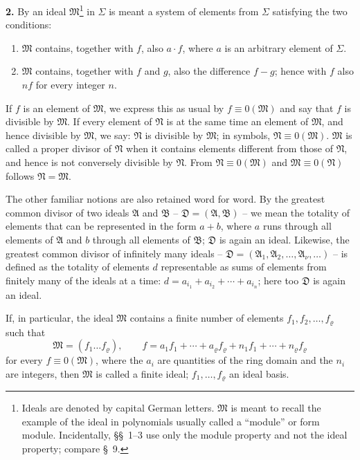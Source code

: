 \documentclass[11pt]{article}
\newcommand{\ideal}[1]{\mathfrak{#1}}
\begin{document}
\textbf{2.} By an ideal $\ideal M$\footnote{Ideals are denoted by capital German letters. $\ideal M$ is meant to recall the example of the ideal in polynomials usually called a ``module'' or form module. Incidentally, \S\S~1--3 use only the module property and not the ideal property; compare \S~9.} in $\Sigma$ is meant a system of elements from $\Sigma$ satisfying the two conditions:
\begin{enumerate}
\item $\ideal M$ contains, together with $f$, also $a\cdot f$, where $a$ is an arbitrary element of $\Sigma$.
\item $\ideal M$ contains, together with $f$ and $g$, also the difference $f-g$; hence with $f$ also $nf$ for every integer $n$.
\end{enumerate}
If $f$ is an element of $\ideal M$, we express this as usual by $f\equiv0(\ideal M)$ and say that $f$ is divisible by $\ideal M$. If every element of $\ideal N$ is at the same time an element of $\ideal M$, and hence divisible by $\ideal M$, we say: $\ideal N$ is divisible by $\ideal M$; in symbols, $\ideal N\equiv0(\ideal M)$. $\ideal M$ is called a proper divisor of $\ideal N$ when it contains elements different from those of $\ideal N$, and hence is not conversely divisible by $\ideal N$. From $\ideal N\equiv0(\ideal M)$ and $\ideal M\equiv0(\ideal N)$ follows $\ideal N=\ideal M$.

The other familiar notions are also retained word for word. By the greatest common divisor of two ideals $\ideal A$ and $\ideal B$ -- $\ideal D=(\ideal A,\ideal B)$ -- we mean the totality of elements that can be represented in the form $a+b$, where $a$ runs through all elements of $\ideal A$ and $b$ through all elements of $\ideal B$; $\ideal D$ is again an ideal. Likewise, the greatest common divisor of infinitely many ideals -- $\ideal D=(\ideal A_1,\ideal A_2,\ldots,\ideal A_\nu,\ldots)$ -- is defined as the totality of elements $d$ representable as sums of elements from finitely many of the ideals at a time: $d=a_{i_1}+a_{i_2}+\cdots+a_{i_n}$; here too $\ideal D$ is again an ideal.

If, in particular, the ideal $\ideal M$ contains a finite number of elements $f_1,f_2,\ldots,f_\varrho$ such that
\[
 \ideal M=(f_1\ldots f_\varrho),\qquad
 f=a_1f_1+\cdots+a_\varrho f_\varrho+n_1f_1+\cdots+n_\varrho f_\varrho
\]
for every $f\equiv0(\ideal M)$, where the $a_i$ are quantities of the ring domain and the $n_i$ are integers, then $\ideal M$ is called a finite ideal; $f_1,
\ldots,f_\varrho$ an ideal basis.
\end{document}
